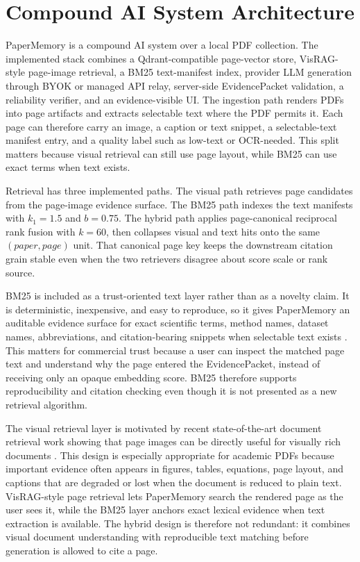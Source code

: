 \documentclass{article}
\begin{document}
\section{Compound AI System Architecture}

PaperMemory is a compound AI system over a local PDF collection. The implemented stack combines a Qdrant-compatible page-vector store, VisRAG-style page-image retrieval, a BM25 text-manifest index, provider LLM generation through BYOK or managed API relay, server-side EvidencePacket validation, a reliability verifier, and an evidence-visible UI. The ingestion path renders PDFs into page artifacts and extracts selectable text where the PDF permits it. Each page can therefore carry an image, a caption or text snippet, a selectable-text manifest entry, and a quality label such as low-text or OCR-needed. This split matters because visual retrieval can still use page layout, while BM25 can use exact terms when text exists.



Retrieval has three implemented paths. The visual path retrieves page candidates from the page-image evidence surface. The BM25 path indexes the text manifests with $k_1=1.5$ and $b=0.75$. The hybrid path applies page-canonical reciprocal rank fusion with $k=60$, then collapses visual and text hits onto the same $(paper, page)$ unit. That canonical page key keeps the downstream citation grain stable even when the two retrievers disagree about score scale or rank source.

BM25 is included as a trust-oriented text layer rather than as a novelty claim. It is deterministic, inexpensive, and easy to reproduce, so it gives PaperMemory an auditable evidence surface for exact scientific terms, method names, dataset names, abbreviations, and citation-bearing snippets when selectable text exists \citep{robertson2009bm25}. This matters for commercial trust because a user can inspect the matched page text and understand why the page entered the EvidencePacket, instead of receiving only an opaque embedding score. BM25 therefore supports reproducibility and citation checking even though it is not presented as a new retrieval algorithm.

The visual retrieval layer is motivated by recent state-of-the-art document retrieval work showing that page images can be directly useful for visually rich documents \citep{yu2024visrag,faysse2024colpali}. This design is especially appropriate for academic PDFs because important evidence often appears in figures, tables, equations, page layout, and captions that are degraded or lost when the document is reduced to plain text. VisRAG-style page retrieval lets PaperMemory search the rendered page as the user sees it, while the BM25 layer anchors exact lexical evidence when text extraction is available. The hybrid design is therefore not redundant: it combines visual document understanding with reproducible text matching before generation is allowed to cite a page.
\end{document}
